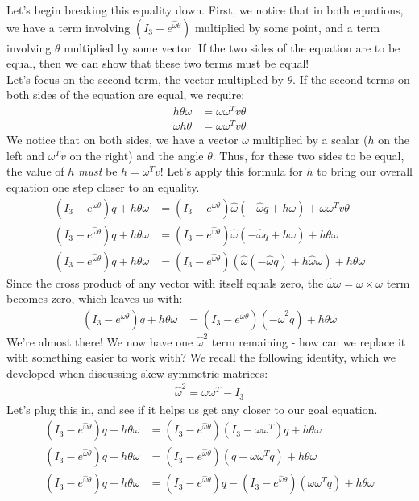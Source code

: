\documentclass[oneside]{book}
\begin{document}
Let's begin breaking this equality down. First, we notice that in both equations, we have a term involving $(I_3 - e^{\hat\omega\theta})$ multiplied by some point, and a term involving $\theta$ multiplied by some vector. If the two sides of the equation are to be equal, then we can show that these two terms must be equal!\\
Let's focus on the second term, the vector multiplied by $\theta$. If the second terms on both sides of the equation are equal, we require:
\begin{align}
    h\theta\omega &= \omega\omega^Tv\theta\\
    \omega h \theta &= \omega\omega^Tv\theta
\end{align}
We notice that on both sides, we have a vector $\omega$ multiplied by a scalar ($h$ on the left and $\omega^Tv$ on the right) and the angle $\theta$. Thus, for these two sides to be equal, the value of $h$ \textit{must} be $h = \omega^Tv$! Let's apply this formula for $h$ to bring our overall equation one step closer to an equality.
\begin{align}
    (I_3 -e^{\hat\omega\theta})q + h\theta\omega &= (I_3 - e^{\hat\omega\theta})\hat\omega(-\hat\omega q + h\omega) + \omega \omega ^T v\theta\\
    (I_3 -e^{\hat\omega\theta})q + h\theta\omega &= (I_3 - e^{\hat\omega\theta})\hat\omega(-\hat\omega q + h\omega) + h\theta \omega\\
    (I_3 -e^{\hat\omega\theta})q + h\theta\omega &= (I_3 - e^{\hat\omega\theta})(\hat\omega(-\hat\omega q)  + h \hat\omega \omega) + h\theta \omega
\end{align}
Since the cross product of any vector with itself equals zero, the $\hat\omega\omega = \omega \times \omega$ term becomes zero, which leaves us with:
\begin{align}
    (I_3 -e^{\hat\omega\theta})q + h\theta\omega &= (I_3 - e^{\hat\omega\theta})(-\hat\omega^2 q) + h\theta \omega
\end{align}
We're almost there! We now have one $\hat\omega^2$ term remaining - how can we replace it with something easier to work with? We recall the following identity, which we developed when discussing skew symmetric matrices:
\begin{align}
    \hat\omega^2 = \omega\omega^T - I_3
\end{align}
Let's plug this in, and see if it helps us get any closer to our goal equation.
\begin{align}
    (I_3 -e^{\hat\omega\theta})q + h\theta\omega &= (I_3 - e^{\hat\omega\theta})(I_3 - \omega\omega^T)q + h\theta \omega\\
    (I_3 -e^{\hat\omega\theta})q + h\theta\omega &= (I_3 - e^{\hat\omega\theta})(q - \omega\omega^Tq) + h\theta \omega\\
    (I_3 -e^{\hat\omega\theta})q + h\theta\omega &= (I_3 - e^{\hat\omega\theta})q - (I_3 - e^{\hat\omega\theta})(\omega\omega^Tq) + h\theta \omega
\end{align}
\end{document}
